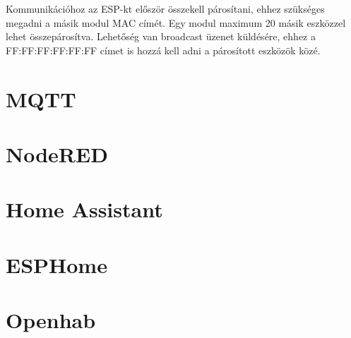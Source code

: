 Kommunikációhoz az ESP-kt először összekell párosítani, ehhez szükséges megadni a másik modul MAC címét. Egy modul maximum 20 másik eszközzel lehet összepárosítva. Lehetőség van broadcast üzenet küldésére, ehhez a FF:FF:FF:FF:FF:FF címet is hozzá kell adni a párosított eszközök közé.


\section{MQTT}

\section{NodeRED}

\section{Home Assistant}

\section{ESPHome}

\section{Openhab}

